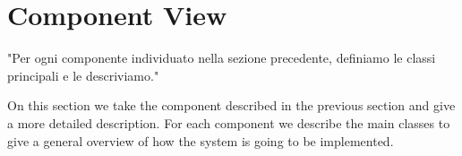 \documentclass[../../../../dd.tex]{subfiles}
\begin{document}
	\section{Component View}

	"Per ogni componente individuato nella sezione precedente, definiamo le classi principali e le descriviamo."
	
	On this section we take the component described in the previous section and give a more detailed description. For each component we describe the main classes to give a general overview of how the system is going to be implemented.
	
	
	
	
	
	
		
\end{document}
